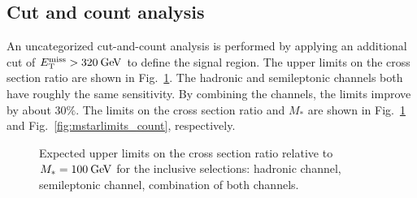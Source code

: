 \subsection{Cut and count analysis}
\label{subsec:cutcount}

An uncategorized cut-and-count analysis is performed by applying an additional cut of $E_\mathrm{T}^{\mathrm{miss}}>320\:\mathrm{Ge\kern -0.1em V}$ to define the signal region. The upper limits on the cross section ratio are shown in Fig.~\ref{fig:rlimits_count}. The hadronic and semileptonic channels both have roughly the same sensitivity. By combining the channels, the limits improve by about $30\%$. The limits on the cross section ratio and $M_*$ are shown in Fig.~\ref{fig:rlimits_count} and Fig.~\ref{fig:mstarlimits_count}, respectively.

\begin{figure}[htbp]
\begin{center}
  \caption{Expected upper limits on the cross section ratio relative to $M_*=100\:\mathrm{Ge\kern -0.1em V}$ for the inclusive selections:  hadronic channel,  semileptonic channel,  combination of both channels.}
  \label{fig:rlimits_count}
\end{center}
\end{figure}

